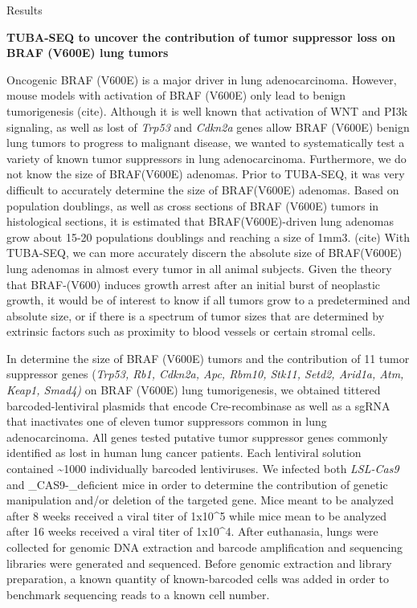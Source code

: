 Results

\textbf{TUBA-SEQ to uncover the contribution of tumor suppressor loss on BRAF (V600E) lung tumors}

Oncogenic BRAF (V600E) is a major driver in lung adenocarcinoma. However, mouse models with activation of BRAF (V600E) only lead to benign tumorigenesis (cite). Although it is well known that activation of WNT and PI3k signaling, as well as lost of \emph{Trp53} and \emph{Cdkn2a} genes allow BRAF (V600E) benign lung tumors to progress to malignant disease, we wanted to systematically test a variety of known tumor suppressors in lung adenocarcinoma. Furthermore, we do not know the size of BRAF(V600E) adenomas. Prior to TUBA-SEQ, it was very difficult to accurately determine the size of BRAF(V600E) adenomas. Based on population doublings, as well as cross sections of BRAF (V600E) tumors in histological sections, it is estimated that BRAF(V600E)-driven lung adenomas grow about 15-20 populations doublings and reaching a size of 1mm3. (cite) With TUBA-SEQ, we can more accurately discern the absolute size of BRAF(V600E) lung adenomas in almost every tumor in all animal subjects. Given the theory that BRAF-(V600) induces growth arrest after an initial burst of neoplastic growth, it would be of interest to know if all tumors grow to a predetermined and absolute size, or if there is a spectrum of tumor sizes that are determined by extrinsic factors such as proximity to blood vessels or certain stromal cells.

In determine the size of BRAF (V600E) tumors and the contribution of 11 tumor suppressor genes (\emph{Trp53, Rb1, Cdkn2a, Apc, Rbm10, Stk11, Setd2, Arid1a, Atm, Keap1, Smad4)} on BRAF (V600E) lung tumorigenesis, we obtained tittered barcoded-lentiviral plasmids that encode Cre-recombinase as well as a sgRNA that inactivates one of eleven tumor suppressors common in lung adenocarcinoma. All genes tested putative tumor suppressor genes commonly identified as lost in human lung cancer patients. Each lentiviral solution contained \textasciitilde1000 individually barcoded lentiviruses. We infected both \emph{LSL-Cas9} and \_CAS9-\_deficient mice in order to determine the contribution of genetic manipulation and/or deletion of the targeted gene. Mice meant to be analyzed after 8 weeks received a viral titer of 1x10\^{}5 while mice mean to be analyzed after 16 weeks received a viral titer of 1x10\^{}4. After euthanasia, lungs were collected for genomic DNA extraction and barcode amplification and sequencing libraries were generated and sequenced. Before genomic extraction and library preparation, a known quantity of known-barcoded cells was added in order to benchmark sequencing reads to a known cell number.

